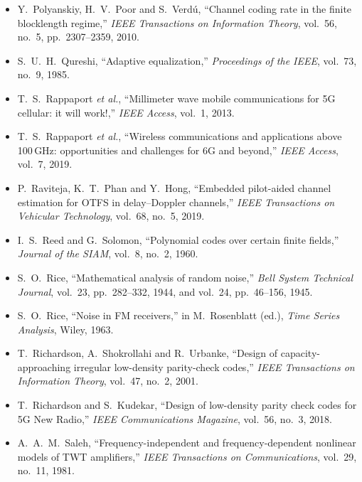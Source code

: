 \begin{itemize}[leftmargin=1.5em,itemindent=-1.5em,itemsep=1.5pt plus 1pt,parsep=0pt,topsep=4pt,label={}]
\item Y.~Polyanskiy, H.~V.~Poor and S.~Verd\'u, ``Channel coding rate in the finite blocklength regime,'' \emph{IEEE Transactions on Information Theory}, vol.~56, no.~5, pp.~2307--2359, 2010.
\item S.~U.~H.~Qureshi, ``Adaptive equalization,'' \emph{Proceedings of the IEEE}, vol.~73, no.~9, 1985.
\item T.~S.~Rappaport \emph{et al.}, ``Millimeter wave mobile communications for 5G cellular: it will work!,'' \emph{IEEE Access}, vol.~1, 2013.
\item T.~S.~Rappaport \emph{et al.}, ``Wireless communications and applications above 100\,GHz: opportunities and challenges for 6G and beyond,'' \emph{IEEE Access}, vol.~7, 2019.
\item P.~Raviteja, K.~T.~Phan and Y.~Hong, ``Embedded pilot-aided channel estimation for OTFS in delay--Doppler channels,'' \emph{IEEE Transactions on Vehicular Technology}, vol.~68, no.~5, 2019.
\item I.~S.~Reed and G.~Solomon, ``Polynomial codes over certain finite fields,'' \emph{Journal of the SIAM}, vol.~8, no.~2, 1960.
\item S.~O.~Rice, ``Mathematical analysis of random noise,'' \emph{Bell System Technical Journal}, vol.~23, pp.~282--332, 1944, and vol.~24, pp.~46--156, 1945.
\item S.~O.~Rice, ``Noise in FM receivers,'' in M.~Rosenblatt (ed.), \emph{Time Series Analysis}, Wiley, 1963.
\item T.~Richardson, A.~Shokrollahi and R.~Urbanke, ``Design of capacity-approaching irregular low-density parity-check codes,'' \emph{IEEE Transactions on Information Theory}, vol.~47, no.~2, 2001.
\item T.~Richardson and S.~Kudekar, ``Design of low-density parity check codes for 5G New Radio,'' \emph{IEEE Communications Magazine}, vol.~56, no.~3, 2018.
\item A.~A.~M.~Saleh, ``Frequency-independent and frequency-dependent nonlinear models of TWT amplifiers,'' \emph{IEEE Transactions on Communications}, vol.~29, no.~11, 1981.

\end{itemize}
